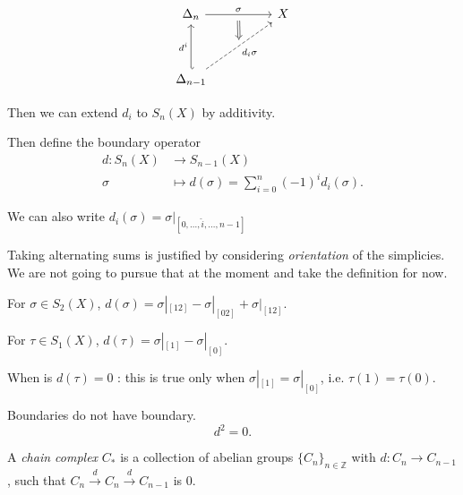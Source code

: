 \[\begin{tikzcd}
	{\Delta_n} && X \\
	\\
	{\Delta_{n-1}}
	\arrow[""{name=0, anchor=center, inner sep=0}, "\sigma", from=1-1, to=1-3]
	\arrow["{d^i}", hook', from=3-1, to=1-1]
	\arrow[""{name=1, anchor=center, inner sep=0}, "{d_i \sigma}"', dashed, from=3-1, to=1-3]
	\arrow[shorten <=4pt, shorten >=4pt, Rightarrow, from=0, to=1]
\end{tikzcd}\]

Then we can extend $d_i$ to $S_n(X)$ by additivity. 

Then define the boundary operator
\begin{align*}
	d: S_n(X) &\longrightarrow S_{n - 1}(X) \\
	\sigma &\longmapsto d(\sigma) = \sum_{i = 0}^n ( - 1)^i d_i(\sigma)
.\end{align*}

We can also write $d_i(\sigma) = \sigma|_{[0,\ldots, \hat{i} , \ldots, n-1]}$

\begin{remark}
	Taking alternating sums is justified by considering \textit{orientation} of the simplicies. We are not going to pursue that at the moment and take the definition for now.
\end{remark}

\begin{example}
	For $\sigma \in S_2(X)$, $d(\sigma) = \sigma|_{[1 2]} - \sigma | _{[0 2]} + \sigma | _{[1 2]}$.

	For $\tau \in S_1(X)$, $d(\tau) = \sigma|_{[1]} - \sigma| _{[0]}$.

	When is $d(\tau) = 0$ : this is true only when $\sigma|_{[1]} = \sigma|_{[0]}$, i.e. $\tau(1) = \tau(0)$.
\end{example}

\begin{lemma}
	\label{lem:Boundaryboundary}
	Boundaries do not have boundary.
	 \[
		d^2 = 0
	.\] 
\end{lemma}

\begin{definition}
	\label{defn:ChainComplex}
	A \textit{chain complex} $C_{*}$ is a collection of abelian groups $\{C_n\} _{n \in \mathbb{Z}}$ with $d: C_n \to C_{n - 1}$, such that $C_n \xrightarrow{d} C_n \xrightarrow{d} C_{n - 1}$ is $0$.
\end{definition}

